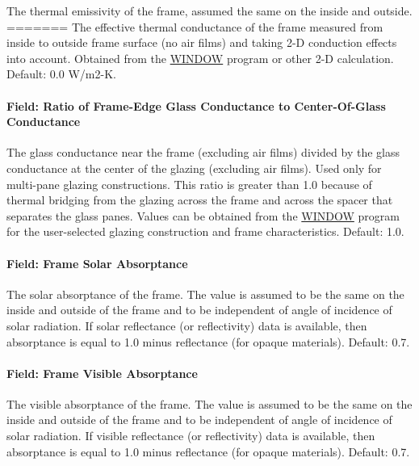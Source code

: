 The thermal emissivity of the frame, assumed the same on the inside and outside.
=======
The effective thermal conductance of the frame measured from inside to outside frame surface (no air films) and taking 2-D conduction effects into account. Obtained from the \href{https://windows.lbl.gov/software-tools#window-heading}{WINDOW} program or other 2-D calculation. Default: 0.0 W/m2-K.

\paragraph{Field: Ratio of Frame-Edge Glass Conductance to Center-Of-Glass Conductance}\label{field-ratio-of-frame-edge-glass-conductance-to-center-of-glass-conductance}

The glass conductance near the frame (excluding air films) divided by the glass conductance at the center of the glazing (excluding air films). Used only for multi-pane glazing constructions. This ratio is greater than 1.0 because of thermal bridging from the glazing across the frame and across the spacer that separates the glass panes. Values can be obtained from the \href{https://windows.lbl.gov/software-tools#window-heading}{WINDOW} program for the user-selected glazing construction and frame characteristics. Default: 1.0.

\paragraph{Field: Frame Solar Absorptance}\label{field-frame-solar-absorptance}

The solar absorptance of the frame. The value is assumed to be the same on the inside and outside of the frame and to be independent of angle of incidence of solar radiation. If solar reflectance (or reflectivity) data is available, then absorptance is equal to 1.0 minus reflectance (for opaque materials). Default: 0.7.

\paragraph{Field: Frame Visible Absorptance}\label{field-frame-visible-absorptance}

The visible absorptance of the frame. The value is assumed to be the same on the inside and outside of the frame and to be independent of angle of incidence of solar radiation. If visible reflectance (or reflectivity) data is available, then absorptance is equal to 1.0 minus reflectance (for opaque materials). Default: 0.7.

